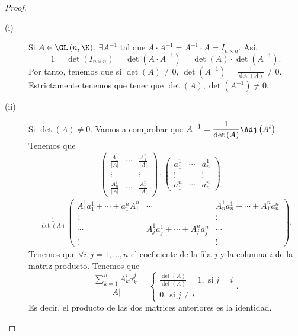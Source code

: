 \begin{proof}
\begin{description}
\item[(i)] Si $\displaystyle A \in \GL\left(n, \K\right) $, $\displaystyle \exists A^{-1} $ tal que $\displaystyle A \cdot A^{-1} = A^{-1} \cdot A = I_{n \times n} $. Así,
	\[1 = \det\left(I_{n \times n}\right) = \det\left(A \cdot A^{-1}\right) = \det\left(A\right) \cdot \det\left(A^{-1}\right) .\]
Por tanto, tenemos que si $\displaystyle \det\left(A\right) \neq 0 $, $\displaystyle \det\left(A^{-1}\right) = \frac{1}{\det\left(A\right)} \neq 0 $. Estrictamente tenemos que tener que $\displaystyle \det\left(A\right), \det\left(A^{-1}\right) \neq 0 $.
\item[(ii)] Si $\displaystyle \det\left(A\right) \neq 0 $. Vamos a comprobar que $\displaystyle A^{-1} = \frac{1}{\det\left(A\right)}\Adj\left(A^{t}\right) $. Tenemos que 
\[ 	\begin{pmatrix} \frac{A^{1}_{1}}{ \left|A\right|} & \cdots & \frac{A^{n}_{1}}{ \left|A\right|} \\
	\vdots & & \vdots \\
	\frac{A^{1}_{n}}{ \left|A\right|} & \cdots & \frac{A^{n}_{n}}{ \left|A\right|}\end{pmatrix} \cdot \begin{pmatrix} a^{1}_{1} & \cdots & a^{1}_{n} \\
\vdots & & \vdots \\
a^{n}_{1} & \cdots & a^{n}_{n}\end{pmatrix} =\]
	\[
\begin{split}
		\frac{1}{\det\left(A\right)}\begin{pmatrix} A^{1}_{1}a^{1}_{1} + \cdots + a^{n}_{1}A^{n}_{1} & \cdots & A^{1}_{n}a^{1}_{n} + \cdots + A^{n}_{1}a^{n}_{n}\\
\vdots & & \vdots \\
\cdots & A^{1}_{j}a^{1}_{j} + \cdots + A^{n}_{j}a^{n}_{j} & \cdots \\
\vdots & & \vdots\end{pmatrix}
.
\end{split}
\]
Tenemos que $\displaystyle \forall i,j = 1, \ldots, n $ el coeficiente de la fila $\displaystyle j $ y la columna $\displaystyle i $ de la matriz producto. Tenemos que
\[\frac{\sum^{n}_{k=1}A^{i}_{k}a^{j}_{k}}{ \left|A\right|} = 
\begin{cases}
\frac{\det\left(A\right)}{\det\left(A\right)} = 1, \; \text{si} \; j =i \\
0, \; \text{si} \; j \neq i
\end{cases}
.\]
Es decir, el producto de las dos matrices anteriores es la identidad.
\end{description}
\end{proof}

